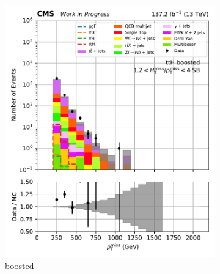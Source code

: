 \begin{figure}[htbp]
    \centering
    \begin{subfigure}[b]{0.24\textwidth}
        \includegraphics[width=\textwidth]{figures/region_plots/2016to18/sideband_2/ttH_boosted.pdf}
        \caption{\ttH boosted}
    \end{subfigure}
    \hfill
    \begin{subfigure}[b]{0.24\textwidth}

\end{subfigure}
\end{figure}
